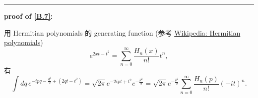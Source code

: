 \documentclass[10pt, a4paper]{article}
\numberwithin{equation}{section}
\begin{document}
\begin{itemize}
\begin{tcolorbox}[title=remark:]
			\noindent\rule[0.5ex]{\linewidth}{0.5pt} %
			
			\textbf{proof of \eqref{B.7}:}
			
			用 Hermitian polynomials 的 generating function (参考 \href{https://en.wikipedia.org/wiki/Hermite_polynomials#Generating_function}{Wikipedia: Hermitian polynomials})
			\begin{equation}
				e^{2 x t - t^2} = \sum_{n = 0}^\infty \frac{H_n(x)}{n!} t^n,
			\end{equation}
			有
			\begin{equation}
				\int dq \, e^{- i p q - \frac{q^2}{2} + (2 q t - t^2)} = \sqrt{2 \pi} e^{- 2 i p t + t^2} e^{- \frac{p^2}{2}} = \sqrt{2 \pi} e^{- \frac{p^2}{2}} \sum_{n = 0}^\infty \frac{H_n(p)}{n!} (- i t)^n.
			\end{equation}
		\end{tcolorbox}
	\end{itemize}
\end{document}
